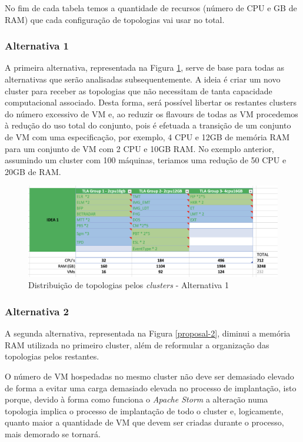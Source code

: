 No fim de cada tabela temos a quantidade de recursos (número de \ac{CPU} e GB de RAM) que cada 
configuração de topologias vai usar no total.

\subsubsection{Alternativa 1}

A primeira alternativa, representada na Figura \ref{proposal-1}, serve de base para todas as
alternativas que serão analisadas subsequentemente. A ideia é criar um novo \gls{cluster}
para receber as topologias que não necessitam de tanta capacidade computacional associado. Desta 
forma, será possível libertar os restantes \glspl{cluster} do número excessivo de \ac{VM} 
e, ao reduzir os \glspl{flavour} de todas as \ac{VM} procedemos à redução do uso total do
conjunto, pois é efetuada a transição de um conjunto de \ac{VM} com uma especificação, por exemplo,
4 \ac{CPU} e 12GB de memória RAM para um conjunto de \ac{VM} com 2 \ac{CPU} e 10GB RAM. No exemplo
anterior, assumindo um \gls{cluster} com 100 máquinas, teriamos uma redução de 50 \ac{CPU} e 20GB 
de RAM.

\begin{figure}[H]
  \centerline{\includegraphics[scale=0.4]{media/content/analise/proposal-1.png}}
  \caption{Distribuição de topologias pelos \textit{clusters} - Alternativa 1}
  \label{proposal-1}
\end{figure}

\subsubsection{Alternativa 2}

A segunda alternativa, representada na Figura \ref{proposal-2}, diminui a memória RAM utilizada no
primeiro \gls{cluster}, além de reformular a organização das topologias pelos restantes. 

O número de \ac{VM} hospedadas no mesmo \gls{cluster} não deve ser demasiado elevado de forma a
evitar uma carga demasiado elevada no processo de implantação, isto porque, devido à forma como 
funciona o \textit{Apache Storm} a alteração numa topologia implica o processo de implantação de
todo o \gls{cluster} e, logicamente, quanto maior a quantidade de \ac{VM} que devem ser criadas
durante o processo, mais demorado se tornará.

